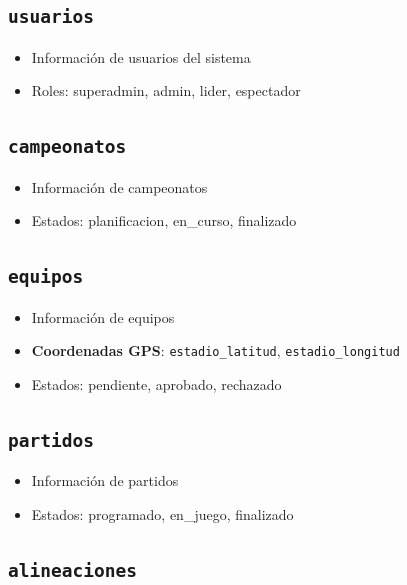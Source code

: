 \documentclass[
  spanish,
  11pt,
  letterpaper,
]{book}
\providecommand{\tightlist}{%
  \setlength{\itemsep}{0pt}\setlength{\parskip}{0pt}}
\begin{document}
\subsection{\texorpdfstring{\texttt{usuarios}}{usuarios}}\label{usuarios}

\begin{itemize}
\tightlist
\item
  Información de usuarios del sistema
\item
  Roles: superadmin, admin, lider, espectador
\end{itemize}

\subsection{\texorpdfstring{\texttt{campeonatos}}{campeonatos}}\label{campeonatos}

\begin{itemize}
\tightlist
\item
  Información de campeonatos
\item
  Estados: planificacion, en\_curso, finalizado
\end{itemize}

\subsection{\texorpdfstring{\texttt{equipos}}{equipos}}\label{equipos}

\begin{itemize}
\tightlist
\item
  Información de equipos
\item
  \textbf{Coordenadas GPS}: \texttt{estadio\_latitud},
  \texttt{estadio\_longitud}
\item
  Estados: pendiente, aprobado, rechazado
\end{itemize}

\subsection{\texorpdfstring{\texttt{partidos}}{partidos}}\label{partidos}

\begin{itemize}
\tightlist
\item
  Información de partidos
\item
  Estados: programado, en\_juego, finalizado
\end{itemize}

\subsection{\texorpdfstring{\texttt{alineaciones}}{alineaciones}}\label{alineaciones}
\end{document}
